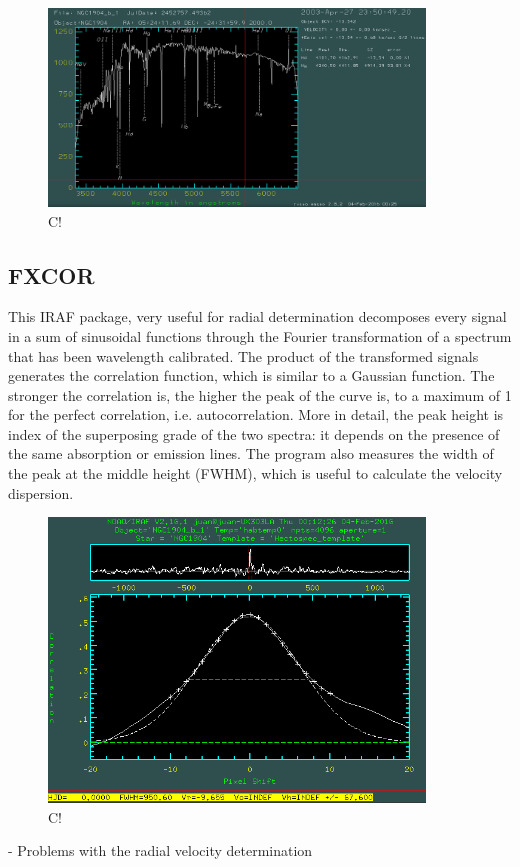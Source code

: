 \begin{figure}[H]
\centering
\includegraphics[width=10cm]{images/emsao.png}
\caption[Ts]{C!}
\end{figure}


\subsection{FXCOR}

This IRAF package, very useful for radial determination decomposes every signal in a sum of sinusoidal functions through the Fourier transformation of a spectrum that has been wavelength calibrated. The product of the transformed signals generates the correlation function, which is similar to a Gaussian function. The stronger the correlation is, the higher the peak of the curve is, to a maximum of 1 for the perfect correlation, i.e. autocorrelation. More in detail, the peak height is index of the superposing grade of the two spectra: it depends on the presence of the same absorption or emission lines. The program also measures the width of the peak at the middle height (FWHM), which is useful to calculate the velocity dispersion.

\begin{figure}[H]
\centering
\includegraphics[width=10cm]{images/fxcor.png}
\caption[Ts]{C!}
\end{figure}

- Problems with the radial velocity determination



